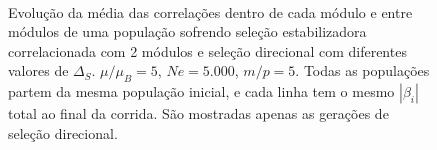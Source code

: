 \begin{figure}[htbp]
   \vspace{-18pt}
   \vspace{11pt}
   \\
   \caption{ Evolução da média das correlações dentro de cada módulo
      e entre módulos de uma população sofrendo seleção estabilizadora
      correlacionada com 2 módulos e seleção direcional com diferentes
   valores de $\Delta_S$. $\mu/\mu_B = 5$, $Ne = 5.000$, $m/p=5$. 
   Todas as populações partem da mesma população inicial, e cada linha
   tem o mesmo $|\beta_i|$ total ao final da corrida. São mostradas apenas
   as gerações de seleção direcional.}
   \label{MFMxSS}
\end{figure}

